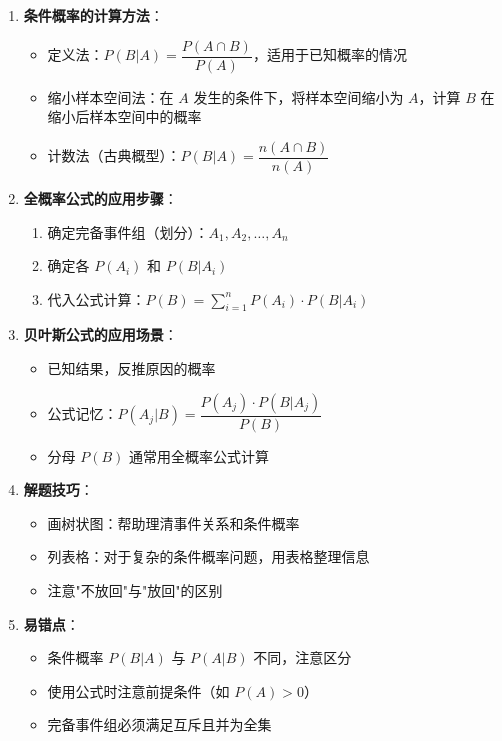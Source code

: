 \documentclass[11pt]{ctexrep}
\begin{document}
\begin{enumerate}
    \item \textbf{条件概率的计算方法}：
    \begin{itemize}
        \item 定义法：$P(B|A) = \dfrac{P(A \cap B)}{P(A)}$，适用于已知概率的情况
        \item 缩小样本空间法：在 $A$ 发生的条件下，将样本空间缩小为 $A$，计算 $B$ 在缩小后样本空间中的概率
        \item 计数法（古典概型）：$P(B|A) = \dfrac{n(A \cap B)}{n(A)}$
    \end{itemize}
    
    \item \textbf{全概率公式的应用步骤}：
    \begin{enumerate}
        \item 确定完备事件组（划分）：$A_1, A_2, \ldots, A_n$
        \item 确定各 $P(A_i)$ 和 $P(B | A_i)$
        \item 代入公式计算：$P(B) = \sum_{i=1}^{n} P(A_i) \cdot P(B | A_i)$
    \end{enumerate}
    
    \item \textbf{贝叶斯公式的应用场景}：
    \begin{itemize}
        \item 已知结果，反推原因的概率
        \item 公式记忆：$P(A_j | B) = \dfrac{P(A_j) \cdot P(B | A_j)}{P(B)}$
        \item 分母 $P(B)$ 通常用全概率公式计算
    \end{itemize}
    
    \item \textbf{解题技巧}：
    \begin{itemize}
        \item 画树状图：帮助理清事件关系和条件概率
        \item 列表格：对于复杂的条件概率问题，用表格整理信息
        \item 注意"不放回"与"放回"的区别
    \end{itemize}
    
    \item \textbf{易错点}：
    \begin{itemize}
        \item 条件概率 $P(B|A)$ 与 $P(A|B)$ 不同，注意区分
        \item 使用公式时注意前提条件（如 $P(A) > 0$）
        \item 完备事件组必须满足互斥且并为全集
    \end{itemize}
\end{enumerate}
\end{document}
